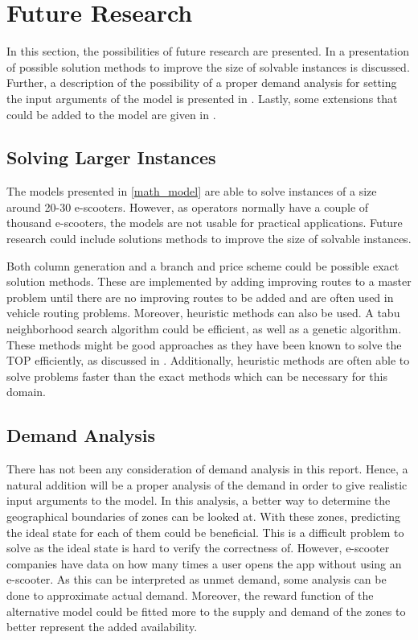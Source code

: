 \chapter{Future Research}\label{future_research}

In this section, the possibilities of future research are presented. In  a presentation of possible solution methods to improve the size of solvable instances is discussed. Further, a description of the possibility of a proper demand analysis for setting the input arguments of the model is presented in . Lastly, some extensions that could be added to the model are given in . 

\section{Solving Larger Instances}\label{solving larger instances}

The models presented in \cref{math_model} are able to solve instances of a size around 20-30 e-scooters. However, as operators normally have a couple of thousand e-scooters, the models are not usable for practical applications. Future research could include solutions methods to improve the size of solvable instances. 

Both column generation and a branch and price scheme could be possible exact solution methods. These are implemented by adding improving routes to a master problem until there are no improving routes to be added and are often used in vehicle routing problems. Moreover, heuristic methods can also be used. A tabu neighborhood search algorithm could be efficient, as well as a genetic algorithm. These methods might be good approaches as they have been known to solve the TOP efficiently, as discussed in . Additionally, heuristic methods are often able to solve problems faster than the exact methods which can be necessary for this domain.

\section{Demand Analysis}\label{demand analysis}
There has not been any consideration of demand analysis in this report. Hence, a natural addition will be a proper analysis of the demand in order to give realistic input arguments to the model. In this analysis, a better way to determine the geographical boundaries of zones can be looked at. With these zones, predicting the ideal state for each of them could be beneficial. This is a difficult problem to solve as the ideal state is hard to verify the correctness of. However, e-scooter companies have data on how many times a user opens the app without using an e-scooter. As this can be interpreted as unmet demand, some analysis can be done to approximate actual demand. Moreover, the reward function of the alternative model could be fitted more to the supply and demand of the zones to better represent the added availability. 

